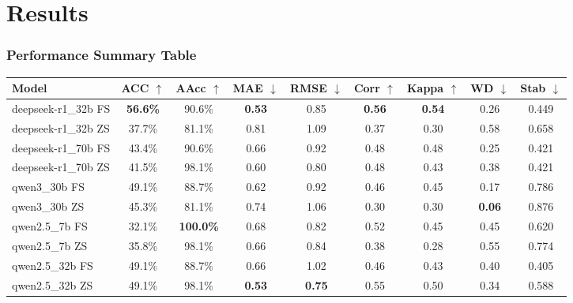 \documentclass[aspectratio=169]{beamer}
\begin{document}
\section{Results}



\begin{frame}
    \frametitle{Performance Summary Table}
    {\color{black}
    {\tiny
    \begin{table}
        \centering
        \setlength{\tabcolsep}{3.5pt}
        \begin{tabular}{lcccccccc}
        \toprule
        \textbf{Model} & \textbf{ACC $\uparrow$} & \textbf{AAcc $\uparrow$} & \textbf{MAE $\downarrow$} & \textbf{RMSE $\downarrow$} & \textbf{Corr $\uparrow$} & \textbf{Kappa $\uparrow$} & \textbf{WD $\downarrow$} & \textbf{Stab $\downarrow$} \\
        \midrule
        deepseek-r1\_32b FS & \cellcolor{green!15}\textbf{56.6\%} & 90.6\% & \cellcolor{green!15}\textbf{0.53} & 0.85 & \cellcolor{green!15}\textbf{0.56} & \cellcolor{green!15}\textbf{0.54} & 0.26 & 0.449 \\
        deepseek-r1\_32b ZS & 37.7\% & \cellcolor{red!15}81.1\% & \cellcolor{red!15}0.81 & \cellcolor{red!15}1.09 & 0.37 & 0.30 & \cellcolor{red!15}0.58 & 0.658 \\
        deepseek-r1\_70b FS & 43.4\% & 90.6\% & 0.66 & 0.92 & 0.48 & 0.48 & 0.25 & 0.421 \\
        deepseek-r1\_70b ZS & 41.5\% & 98.1\% & 0.60 & 0.80 & 0.48 & 0.43 & 0.38 & 0.421 \\
        qwen3\_30b FS       & 49.1\% & 88.7\% & 0.62 & 0.92 & 0.46 & 0.45 & 0.17 & 0.786 \\
        qwen3\_30b ZS       & 45.3\% & \cellcolor{red!15}81.1\% & 0.74 & 1.06 & \cellcolor{red!15}0.30 & 0.30 & \cellcolor{green!15}\textbf{0.06} & \cellcolor{red!15}0.876 \\
        qwen2.5\_7b FS      & \cellcolor{red!15}32.1\% & \cellcolor{green!15}\textbf{100.0\%} & 0.68 & 0.82 & 0.52 & 0.45 & 0.45 & 0.620 \\
        qwen2.5\_7b ZS      & 35.8\% & 98.1\% & 0.66 & 0.84 & 0.38 & \cellcolor{red!15}0.28 & 0.55 & 0.774 \\
        qwen2.5\_32b FS     & 49.1\% & 88.7\% & 0.66 & 1.02 & 0.46 & 0.43 & 0.40 & 0.405 \\
        qwen2.5\_32b ZS     & 49.1\% & 98.1\% & \cellcolor{green!15}\textbf{0.53} & \cellcolor{green!15}\textbf{0.75} & 0.55 & 0.50 & 0.34 & 0.588 \\

\end{tabular}
\end{table}}}
\end{frame}
\end{document}
